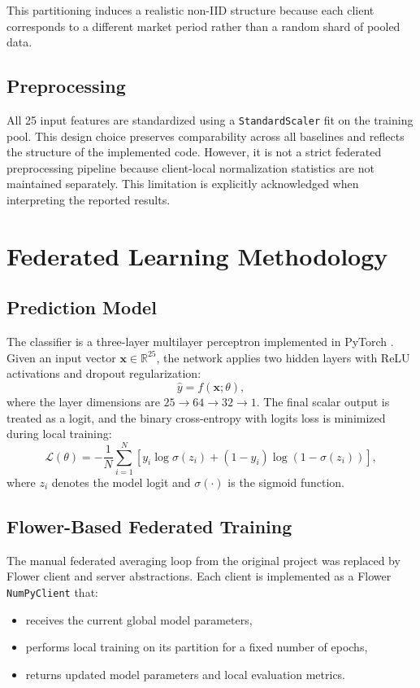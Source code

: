 \documentclass[conference]{IEEEtran}
\begin{document}
This partitioning induces a realistic non-IID structure because each client corresponds to a different market period rather than a random shard of pooled data.

\subsection{Preprocessing}
All 25 input features are standardized using a \texttt{StandardScaler} fit on the training pool. This design choice preserves comparability across all baselines and reflects the structure of the implemented code. However, it is not a strict federated preprocessing pipeline because client-local normalization statistics are not maintained separately. This limitation is explicitly acknowledged when interpreting the reported results.

\section{Federated Learning Methodology}
\subsection{Prediction Model}
The classifier is a three-layer multilayer perceptron implemented in PyTorch \cite{paszke2019}. Given an input vector $\mathbf{x} \in \mathbb{R}^{25}$, the network applies two hidden layers with ReLU activations and dropout regularization:
\begin{equation}
\hat{y} = f(\mathbf{x}; \theta),
\end{equation}
where the layer dimensions are $25 \rightarrow 64 \rightarrow 32 \rightarrow 1$. The final scalar output is treated as a logit, and the binary cross-entropy with logits loss is minimized during local training:
\begin{equation}
\mathcal{L}(\theta) = - \frac{1}{N}\sum_{i=1}^{N} \left[y_i \log \sigma(z_i) + (1-y_i)\log(1-\sigma(z_i))\right],
\end{equation}
where $z_i$ denotes the model logit and $\sigma(\cdot)$ is the sigmoid function.

\subsection{Flower-Based Federated Training}
The manual federated averaging loop from the original project was replaced by Flower client and server abstractions. Each client is implemented as a Flower \texttt{NumPyClient} that:
\begin{itemize}
    \item receives the current global model parameters,
    \item performs local training on its partition for a fixed number of epochs,
    \item returns updated model parameters and local evaluation metrics.
\end{itemize}
\end{document}
